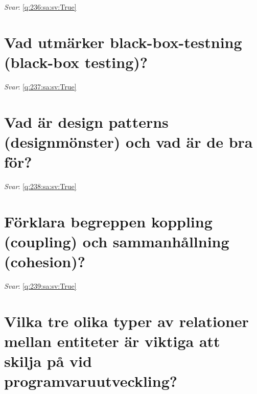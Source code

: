 \documentclass[a4paper,11pt,oneside]{book}
\begin{document}
\begin{sloppypar}
\noindent\makebox[\textwidth]{\hrulefill}

\vspace{1cm}

\textit{Svar}: \autoref{q:236:sa:sv:True}



\section{Vad utm\"arker black-box-testning (black-box testing)?}

\label{q:237:sa:sv:False}

\vspace{2cm}

\noindent\makebox[\textwidth]{\hrulefill}

\vspace{1cm}

\textit{Svar}: \autoref{q:237:sa:sv:True}



\section{Vad \"ar design patterns (designm\"onster) och vad \"ar de bra f\"or?}

\label{q:238:sa:sv:False}

\vspace{2cm}

\noindent\makebox[\textwidth]{\hrulefill}

\vspace{1cm}

\textit{Svar}: \autoref{q:238:sa:sv:True}



\section{F\"orklara begreppen koppling (coupling) och sammanh\r{a}llning (cohesion)?}

\label{q:239:sa:sv:False}

\vspace{2cm}

\noindent\makebox[\textwidth]{\hrulefill}

\vspace{1cm}

\textit{Svar}: \autoref{q:239:sa:sv:True}



\section{Vilka tre olika typer av relationer mellan entiteter \"ar viktiga att skilja p\r{a} vid programvaruutveckling?}


\end{sloppypar}
\end{document}
